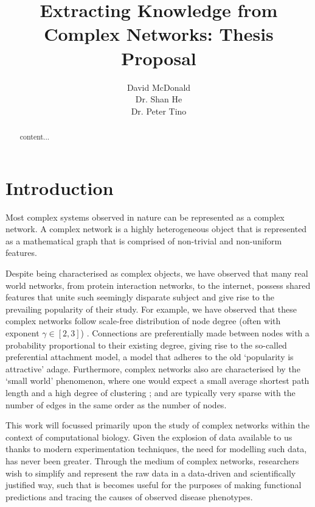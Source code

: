 \documentclass{report}
\title{\Huge \textbf{Extracting Knowledge from Complex Networks: Thesis Proposal}}
\author{David McDonald \\
	Dr. Shan He \\
	Dr. Peter Tino}
\date{}
\begin{document}
	
	\maketitle
	
	\begin{abstract}
		content...
	\end{abstract}
	
	\tableofcontents
	
	\chapter{Introduction}
	
	
	Most complex systems observed in nature can be represented as a complex network. A complex network is a highly heterogeneous object that is represented as a mathematical graph that is comprised of non-trivial and non-uniform features. 
	
	
	
	Despite being characterised as complex objects, we have observed that many real world networks, from protein interaction networks, to the internet, possess shared features that unite such seemingly disparate subject and give rise to the prevailing popularity of their study. For example, we have observed that these complex networks follow scale-free distribution of node degree (often with exponent $\gamma\in [2, 3]$) \cite{barabasi1999emergence,barabasi2009scale}. Connections are preferentially made between nodes with a probability proportional to their existing degree, giving rise to the so-called preferential attachment model, a model that adheres to the old `popularity is attractive' adage. Furthermore, complex networks also are characterised by the `small world' phenomenon, where one would expect a small average shortest path length and a high degree of clustering \cite{watts1998collective}; and are typically very sparse with the number of edges in the same order as the number of nodes. 
	
	This work will focussed primarily upon the study of complex networks within the context of computational biology. Given the explosion of data available to us thanks to modern experimentation techniques, the need for modelling such data, has never been greater. Through the medium of complex networks, researchers wish to simplify and represent the raw data in a data-driven and scientifically justified way, such that is becomes useful for the purposes of making functional predictions and tracing the causes of observed disease phenotypes. 
	
\end{document}

